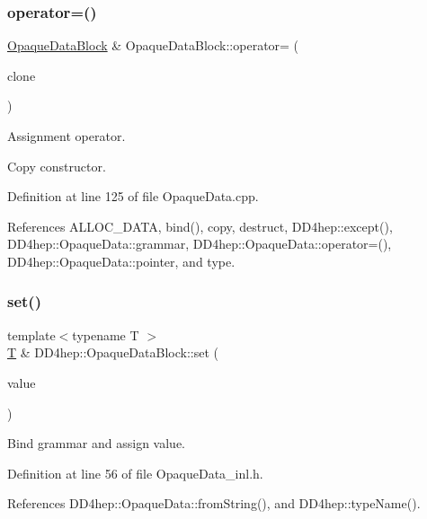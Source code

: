 \subsubsection{\texorpdfstring{operator=()}{operator=()}}
{\footnotesize\ttfamily \hyperlink{class_d_d4hep_1_1_opaque_data_block}{Opaque\+Data\+Block} \& Opaque\+Data\+Block\+::operator= (\begin{DoxyParamCaption}\item[{const \hyperlink{class_d_d4hep_1_1_opaque_data_block}{Opaque\+Data\+Block} \&}]{clone }\end{DoxyParamCaption})}



Assignment operator. 

Copy constructor. 

Definition at line 125 of file Opaque\+Data.\+cpp.



References A\+L\+L\+O\+C\+\_\+\+D\+A\+TA, bind(), copy, destruct, D\+D4hep\+::except(), D\+D4hep\+::\+Opaque\+Data\+::grammar, D\+D4hep\+::\+Opaque\+Data\+::operator=(), D\+D4hep\+::\+Opaque\+Data\+::pointer, and type.

\hypertarget{class_d_d4hep_1_1_opaque_data_block_a3e940f2939e5783016a2274b2aecd512}{}\label{class_d_d4hep_1_1_opaque_data_block_a3e940f2939e5783016a2274b2aecd512} 
\subsubsection{\texorpdfstring{set()}{set()}}
{\footnotesize\ttfamily template$<$typename T $>$ \\
\hyperlink{class_t}{T} \& D\+D4hep\+::\+Opaque\+Data\+Block\+::set (\begin{DoxyParamCaption}\item[{const std\+::string \&}]{value }\end{DoxyParamCaption})}



Bind grammar and assign value. 



Definition at line 56 of file Opaque\+Data\+\_\+inl.\+h.



References D\+D4hep\+::\+Opaque\+Data\+::from\+String(), and D\+D4hep\+::type\+Name().



